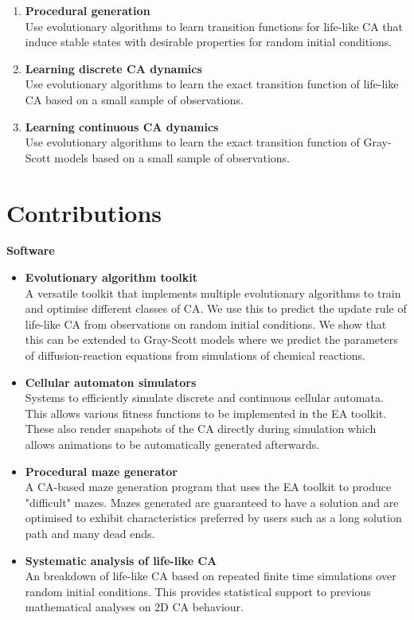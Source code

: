\begin{enumerate}
    \item \textbf{Procedural generation}\label{obj-1}\\
    Use evolutionary algorithms to learn transition functions for life-like CA that induce stable states with desirable properties for random initial conditions.
    \item \textbf{Learning discrete CA dynamics}\\
    Use evolutionary algorithms to learn the exact transition function of life-like CA based on a small sample of observations.
    \item \textbf{Learning continuous CA dynamics}\\
    Use evolutionary algorithms to learn the exact transition function of Gray-Scott models based on a small sample of observations.
\end{enumerate}

\section{Contributions}
\textbf{Software}
\begin{itemize}
    \item \textbf{Evolutionary algorithm toolkit}\\ A versatile toolkit that implements multiple evolutionary algorithms to train and optimise different classes of CA. We use this to predict the update rule of life-like CA from observations on random initial conditions. We show that this can be extended to Gray-Scott models where we predict the parameters of diffusion-reaction equations from simulations of chemical reactions.
    \item \textbf{Cellular automaton simulators}\\ Systems to efficiently simulate discrete and continuous cellular automata. This allows various fitness functions to be implemented in the EA toolkit. These also render snapshots of the CA directly during simulation which allows animations to be automatically generated afterwards.
    \item \textbf{Procedural maze generator}\\ A CA-based maze generation program that uses the EA toolkit to produce "difficult" mazes. Mazes generated are guaranteed to have a solution and are optimised to exhibit characteristics preferred by users such as a long solution path and many dead ends.
    \item \textbf{Systematic analysis of life-like CA}\\ An breakdown of life-like CA based on repeated finite time simulations over random initial conditions. This provides statistical support to previous mathematical analyses on 2D CA behaviour.
\end{itemize}

